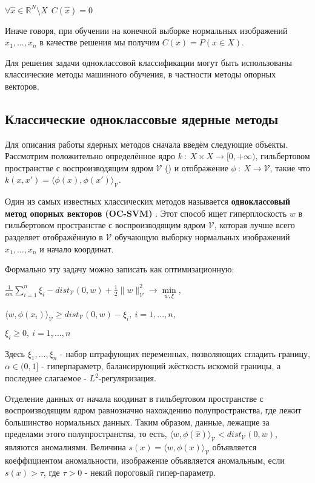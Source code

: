 \documentclass{article}
\begin{document}
\begin{large}
\begin{center}
	$\forall \hat x \in \mathbb{R}^N \setminus X \ \ C(\hat x) = 0$
\end{center}

Иначе говоря, при обучении на конечной выборке нормальных изображений $x_1, ..., x_n$ в качестве решения мы получим $C(x) = P(x \in X)$.

Для решения задачи одноклассовой классификации могут быть использованы классические методы машинного обучения, в частности методы опорных векторов.


\subsection{Классические одноклассовые ядерные методы}

Для описания работы ядерных методов сначала введём следующие объекты. Рассмотрим положительно определённое ядро $k \ : \ X \times X \rightarrow [0, +\infty)$, гильбертовом пространстве с воспроизводящим ядром $\mathcal{V}$ (\cite{rkhs}) и отображение $\phi \ : \ X \rightarrow \mathcal{V}$, такие что $k(x, x') = \langle \phi(x), \phi(x') \rangle_{\mathcal{V}}$.

Один из самых известных классических методов называется \textbf{одноклассовый метод опорных векторов (OC-SVM)} \cite{svm}. Этот способ ищет гиперплоскость $w$ в гильбертовом пространстве с воспроизводящим ядром $\mathcal{V}$, которая лучше всего разделяет отображённую в $\mathcal{V}$ обучающую выборку нормальных изображений $x_1, ..., x_n$ и начало координат.

Формально эту задачу можно записать как оптимизационную:
\begin{center}
	$\frac{1}{\alpha n} \sum\limits_{i=1}^{n} \xi_i  - dist_{\mathcal{V}}(0, w) + \frac{1}{2} \|w\|^2_{\mathcal{V}} \rightarrow \min\limits_{w, \xi}$,
	
	
	$\langle w, \phi(x_i) \rangle_{\mathcal{V}} \ge dist_{\mathcal{V}}(0, w) - \xi_i, \ i = 1, ..., n$,
	
	$\xi_i \ge 0, \ i = 1, ..., n$
\end{center}

Здесь $\xi_1, ..., \xi_n$ - набор штрафующих переменных, позволяющих сгладить границу, $\alpha \in (0, 1]$ - гиперпараметр, балансирующий жёсткость искомой границы, а последнее слагаемое - $L^2$-регуляризация.

Отделение данных от начала коодинат в гильбертовом пространстве с воспроизводящим ядром равнозначно нахождению полупространства, где лежит большинство нормальных данных. Таким образом, данные, лежащие за пределами этого полупространства, то есть, $\langle w, \phi(\hat x) \rangle_{\mathcal{V}} < dist_{\mathcal{V}}(0, w)$, являются аномалиями. Величина $s(x) = \langle w, \phi(x) \rangle_{\mathcal{V}}$ объявляется коеффициентом аномальности, изображение объявляется аномальным, если $s(x) > \tau$, где $\tau > 0$ - некий пороговый гипер-параметр.


\end{large}
\end{document}
